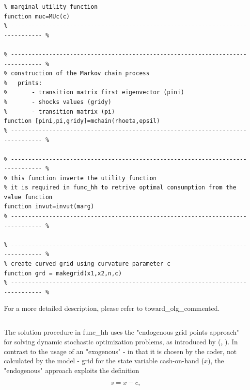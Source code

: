 \documentclass[12pt,a4paper]{article}
\begin{document}
\pagebreak
\begin{lstlisting}[frame=single]
% ------------------------------------------------------------------------------- %
% marginal utility function
function muc=MUc(c)
% ------------------------------------------------------------------------------- %

% ------------------------------------------------------------------------------- %
% construction of the Markov chain process
%   prints:
%       - transition matrix first eigenvector (pini)
%       - shocks values (gridy)
%       - transition matrix (pi)
function [pini,pi,gridy]=mchain(rhoeta,epsil)
% ------------------------------------------------------------------------------- %

% ------------------------------------------------------------------------------- %
% this function inverte the utility function
% it is required in func_hh to retrive optimal consumption from the value function
function invut=invut(marg)
% ------------------------------------------------------------------------------- %

% ------------------------------------------------------------------------------- %
% create curved grid using curvature parameter c
function grd = makegrid(x1,x2,n,c)
% ------------------------------------------------------------------------------- %
\end{lstlisting}

For a more detailed description, please refer to {\selectfont toward\_olg\_commented}.

\subsection{}

The solution procedure in {\selectfont func\_hh} uses the "endogenous grid points approach" for solving dynamic stochastic optimization problems, as introduced by \citeauthor{carroll2002lecture} (\citeyear{carroll2002lecture}, \citeyear{carroll2006method}). In contrast to the usage of an "exogenous" - in that it is chosen by the coder, not calculated by the model - grid for the state variable cash-on-hand ($x$), the "endogenous" approach exploits the definition

$$ s = x - c ,$$
\end{document}
